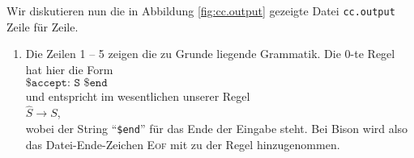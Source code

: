 Wir diskutieren nun die in Abbildung \ref{fig:cc.output} gezeigte Datei \texttt{cc.output}
Zeile f\"ur Zeile.
\begin{enumerate}
\item Die Zeilen 1 -- 5 zeigen die zu Grunde liegende Grammatik.  Die 0-te Regel hat hier
      die Form
      \\[0.2cm]
      \hspace*{1.3cm}
      $\texttt{\$accept: S \$end}$
      \\[0.2cm]
      und entspricht im wesentlichen unserer Regel
      \\[0.2cm]
      \hspace*{1.3cm}
      $\widehat{S} \rightarrow S$,
      \\[0.2cm]
      wobei der String ``\texttt{\$end}''
      f\"ur das Ende der Eingabe steht.  Bei Bison wird also das Datei-Ende-Zeichen
      \textsc{Eof} mit zu der Regel hinzugenommen.


\end{enumerate}
